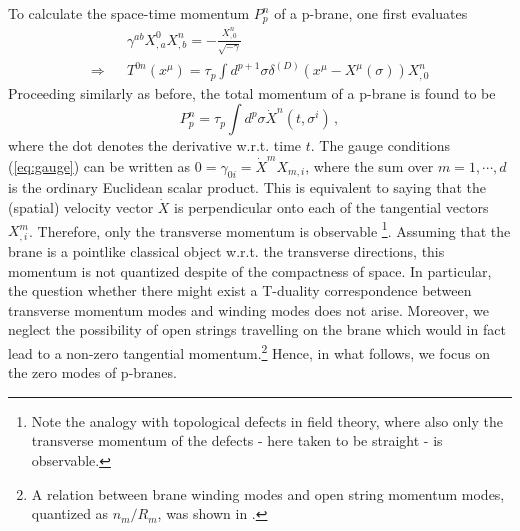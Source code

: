 \documentclass[a4paper,twocolumn,nofootinbib,tightenlines,prd,aps,
               superscriptaddress]{revtex4} %
\newcommand{\si}{\sigma}
\newcommand{\ga}{\gamma}
\newcommand{\de}{\delta}
\newcommand{\nn}{\nonumber}
\begin{document}
To calculate the space-time momentum $P^n_p$ of a p-brane, one
first evaluates
\begin{eqnarray}
     &&\ga^{ab} X^0_{,a}
     X^n_{,b}=-\frac{X^n_{,0}}{\sqrt{-\ga}}\nn\\
     \Rightarrow && T^{0n} (x^\mu) = \tau_p \int d^{p+1}\si
    \de^{(D)}(x^\mu-X^\mu (\si))X^n_{,0}
\end{eqnarray}
Proceeding similarly as before, the total momentum of a p-brane is
found to be
\begin{equation}
    P^n_p = \tau_p \int d^p \si \dot{X}^n(t,\si^i)\,,
\end{equation}
where the dot denotes the derivative w.r.t. time $t$. The gauge
conditions (\ref{eq:gauge}) can be written as $0 =
\ga_{0i}=\dot{X}^m X_{m,i}$, where the sum over $m=1,\cdots,d$ is
the ordinary Euclidean scalar product. This is equivalent to
saying that the (spatial) velocity vector $\dot{X}$ is
perpendicular onto each of the tangential vectors $X^m_{,i}$.
Therefore, only the transverse momentum is observable
\footnote{Note the analogy with topological defects in field
theory, where also only the transverse momentum
of the defects - here taken to be straight - is observable.}. Assuming
that the brane is a pointlike classical object w.r.t. the
transverse directions, this momentum is not quantized despite of
the compactness of space. In particular, the question whether
there might exist a T-duality correspondence between transverse
momentum modes and winding modes does not arise. Moreover, we
neglect the possibility of open strings travelling on the brane
which would in fact lead to a non-zero tangential
momentum.\footnote{A relation between brane winding modes and open
string momentum modes, quantized as $n_m/R_m$, was shown in
\cite{Sen:1996cf}.} Hence, in what follows, we focus on the zero
modes of p-branes.
\end{document}
